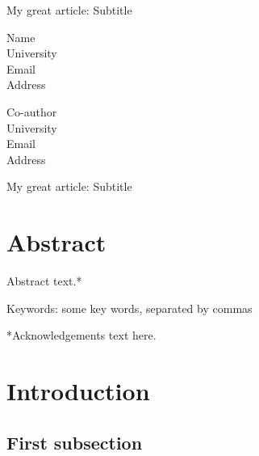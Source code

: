 \documentclass[letter, 12pt]{article} %
\title{\Large{\bf  }}
\author{}
\date{}
\begin{document}
\begingroup %
\renewcommand*\finalnamedelim{ \& }

\maketitle
\setlength\parindent{0pt} %
\setlength{\parskip}{1em} %

My great article: Subtitle \\

\vspace{1cm}

Name \\
University \\
Email \\
Address 

\vspace{1cm}

Co-author \\
University \\
Email \\
Address

\clearpage

My great article: Subtitle \\

\clearpage

\section*{Abstract}

Abstract text.*

Keywords: some key words, separated by commas

\vspace{2cm}

*Acknowledgements text here.

\clearpage




\normalsize
\section{Introduction}


\subsection{First subsection}
\end{document}
